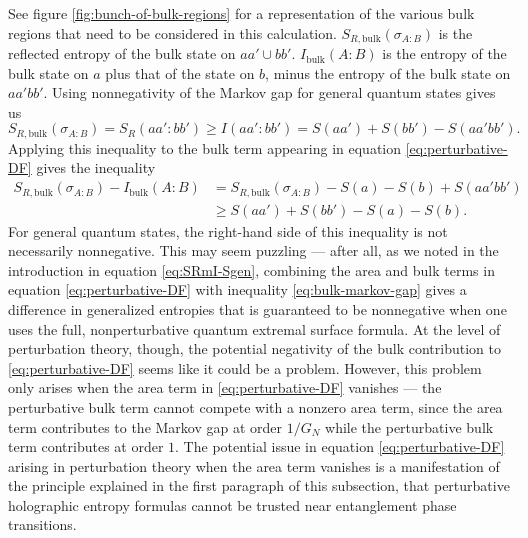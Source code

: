 \documentclass[a4paper,11pt]{article}
\begin{document}
See figure \ref{fig:bunch-of-bulk-regions} for a representation of the various bulk regions that need to be considered in this calculation. $S_{R,\text{bulk}}(\sigma_{A:B})$ is the reflected entropy of the bulk state on $aa' \cup bb'$. $I_{\text{bulk}}(A:B)$ is the entropy of the bulk state on $a$ plus that of the state on $b$, minus the entropy of the bulk state on $a a' b b'$. Using nonnegativity of the Markov gap for general quantum states gives us
\begin{equation}
    S_{R, \text{bulk}}(\sigma_{A:B})
        = S_R(aa':bb') 
        \geq I(a a' : bb')
        = S(a a') + S(b b') - S(a a' b b').
\end{equation}
Applying this inequality to the bulk term appearing in equation \eqref{eq:perturbative-DF} gives the inequality
\begin{align}
    S_{R, \text{bulk}}(\sigma_{A:B})
                - I_{\text{bulk}}(A:B)
        & = S_{R, \text{bulk}}(\sigma_{A:B})
                - S(a) - S(b) + S(aa' bb')  \nonumber \\
        & \geq S(a a') + S(b b') - S(a) - S(b). \label{eq:bulk-markov-gap}
\end{align}
For general quantum states, the right-hand side of this inequality is not necessarily nonnegative. This may seem puzzling --- after all, as we noted in the introduction in equation \eqref{eq:SRmI-Sgen}, combining the area and bulk terms in equation \eqref{eq:perturbative-DF} with inequality \eqref{eq:bulk-markov-gap} gives a difference in generalized entropies that is guaranteed to be nonnegative when one uses the full, nonperturbative quantum extremal surface formula. At the level of perturbation theory, though, the potential negativity of the bulk contribution to \eqref{eq:perturbative-DF} seems like it could be a problem. However, this problem only arises when the area term in \eqref{eq:perturbative-DF} vanishes --- the perturbative bulk term cannot compete with a nonzero area term, since the area term contributes to the Markov gap at order $1/G_N$ while the perturbative bulk term contributes at order $1$. The potential issue in equation \eqref{eq:perturbative-DF} arising in perturbation theory when the area term vanishes is a manifestation of the principle explained in the first paragraph of this subsection, that perturbative holographic entropy formulas cannot be trusted near entanglement phase transitions.
\end{document}
